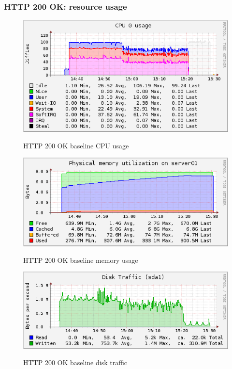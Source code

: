 \documentclass[Measurement results]{subfiles}
\begin{document}
\subsubsection{HTTP 200 OK: resource usage}
\label{sec:HTTP 200 OK baseline resource usage}
\begin{figure}[H]
\centering
\caption{HTTP 200 OK baseline CPU usage}
\includegraphics[scale=0.7]{images/results/baseline_200/cpu.png}
\label{fig:Baseline Nginx CPU usage}
\end{figure}

\begin{figure}[H]
\centering
\caption{HTTP 200 OK baseline memory usage}
\includegraphics[scale=0.7]{images/results/baseline_200/memory.png}
\label{fig:Baseline Nginx memory usage}
\end{figure}

\begin{figure}[H]
\centering
\caption{HTTP 200 OK baseline disk traffic}
\includegraphics[scale=0.7]{images/results/baseline_200/disk.png}
\label{fig:Baseline Nginx disk traffic}
\end{figure}
\end{document}
